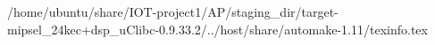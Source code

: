 /home/ubuntu/share/IOT-project1/AP/staging_dir/target-mipsel_24kec+dsp_uClibc-0.9.33.2/../host/share/automake-1.11/texinfo.tex